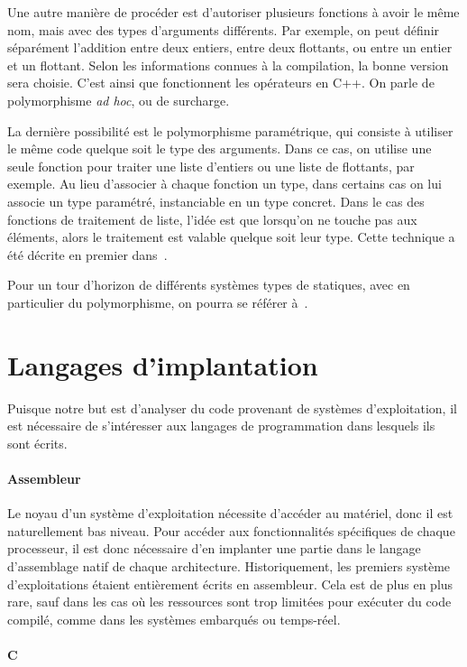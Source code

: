 Une autre manière de procéder est d'autoriser plusieurs fonctions à avoir le
même nom, mais avec des types d'arguments différents. Par exemple, on peut
définir séparément l'addition entre deux entiers, entre deux flottants, ou entre
un entier et un flottant. Selon les informations connues à la compilation, la
bonne version sera choisie. C'est ainsi que fonctionnent les opérateurs en C++.
On parle de polymorphisme \emph{ad hoc}, ou de surcharge.

La dernière possibilité est le polymorphisme paramétrique, qui consiste à
utiliser le même code quelque soit le type des arguments. Dans ce cas, on
utilise une seule fonction pour traiter une liste d'entiers ou une liste de
flottants, par exemple. Au lieu d'associer à chaque fonction un type, dans
certains cas on lui associe un type paramétré, instanciable en un type concret.
Dans le cas des fonctions de traitement de liste, l'idée est que lorsqu'on ne
touche pas aux éléments, alors le traitement est valable quelque soit leur type.
Cette technique a été décrite en premier dans~\cite{Milner78}.

Pour un tour d'horizon de différents systèmes types de statiques, avec en
particulier du polymorphisme, on pourra se référer à~\cite{TAPL}.

\section{Langages d'implantation}

Puisque notre but est d'analyser du code provenant de systèmes d'exploitation,
il est nécessaire de s'intéresser aux langages de programmation dans lesquels
ils sont écrits.

\paragraph{Assembleur}

Le noyau d'un système d'exploitation nécessite d'accéder au matériel, donc il
est naturellement bas niveau. Pour accéder aux fonctionnalités spécifiques de
chaque processeur, il est donc nécessaire d'en implanter une partie dans le
langage d'assemblage natif de chaque architecture. Historiquement, les premiers
système d'exploitations étaient entièrement écrits en assembleur. Cela est de
plus en plus rare, sauf dans les cas où les ressources sont trop limitées pour
exécuter du code compilé, comme dans les systèmes embarqués ou temps-réel.

\paragraph{C}

